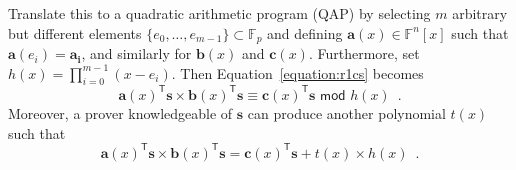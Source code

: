 \documentclass{article}
\begin{document}
Translate this to a quadratic arithmetic program (QAP) by selecting $m$ arbitrary but different elements $\{e_0, \ldots, e_{m-1}\} \subset \mathbb{F}_p$ and defining $\mathbf{a}(x) \in \mathbb{F}^n[x]$ such that $\mathbf{a}(e_i) = \mathbf{a_i}$, and similarly for $\mathbf{b}(x)$ and $\mathbf{c}(x)$. Furthermore, set $h(x) = \prod_{i=0}^{m-1} (x-e_i)$. Then Equation~\ref{equation:r1cs} becomes
\begin{equation} \label{equation:qap_modular}
    \mathbf{a}(x)^\mathsf{T}\mathbf{s} \times \mathbf{b}(x)^\mathsf{T}\mathbf{s} \equiv \mathbf{c}(x)^\mathsf{T}\mathbf{s} \,\, \mathsf{mod} \,\, h(x) \enspace .
\end{equation}
Moreover, a prover knowledgeable of $\mathbf{s}$ can produce another polynomial $t(x)$ such that
\begin{equation} \label{equation:qap_explicit}
    \mathbf{a}(x)^\mathsf{T}\mathbf{s} \times \mathbf{b}(x)^\mathsf{T}\mathbf{s} = \mathbf{c}(x)^\mathsf{T}\mathbf{s} + t(x) \times h(x) \enspace .
\end{equation}
\end{document}

